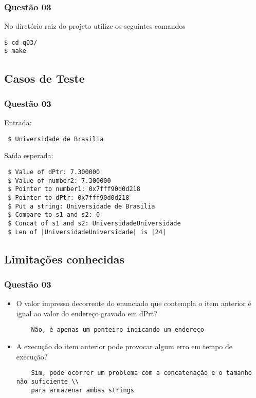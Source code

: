 \documentclass[11pt,a4paper]{article}
\begin{document}
\subsubsection{Questão 03}
No diretório raiz do projeto utilize os seguintes comandos
\begin{verbatim}
$ cd q03/
$ make
\end{verbatim}

\subsection{Casos de Teste}

\subsubsection{Questão 03}

Entrada:
\begin{verbatim}
 $ Universidade de Brasilia
\end{verbatim}
Saída esperada:
\begin{verbatim}
 $ Value of dPtr: 7.300000
 $ Value of number2: 7.300000
 $ Pointer to number1: 0x7fff90d0d218
 $ Pointer to dPtr: 0x7fff90d0d218
 $ Put a string: Universidade de Brasilia
 $ Compare to s1 and s2: 0
 $ Concat of s1 and s2: UniversidadeUniversidade
 $ Len of |UniversidadeUniversidade| is |24|
\end{verbatim}

\subsection{Limitações conhecidas}
\subsubsection{Questão 03}
\begin{itemize}
\item
O valor impresso decorrente do enunciado que contempla o item anterior é igual ao
valor do endereço gravado em dPrt?
\begin{verbatim}
    Não, é apenas um ponteiro indicando um endereço
    \end{verbatim}

\item
  A execução do item anterior pode provocar algum erro em tempo de execução?
\begin{verbatim}
    Sim, pode ocorrer um problema com a concatenação e o tamanho não suficiente \\
    para armazenar ambas strings
\end{verbatim}



\end{itemize}
\end{document}
